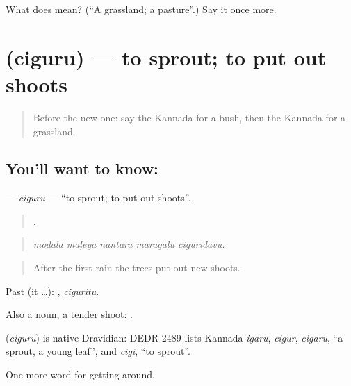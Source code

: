 \begin{tcolorbox}[breakable,colback=teal!4,colframe=teal!35!black,title={Before you move on}]
What does  mean? (\textquotedblleft{}A grassland; a pasture\textquotedblright{}.) Say it once more.
\end{tcolorbox}
\section[\texorpdfstring{\kn{ಚಿಗುರು} (ciguru)}{ಚಿಗುರು (ciguru)}]{ (ciguru) — to sprout; to put out shoots}

\label{lesson:KA-C479-ciguru}



\begin{quote}
Before the new one: say the Kannada for a bush, then the Kannada for a grassland.
\end{quote}

\subsection*{You'll want to know: }
\textbf{} — \emph{ciguru} — \textquotedblleft{}to sprout; to put out shoots\textquotedblright{}.

\begin{quote}
    .
\end{quote}

\begin{quote}
\emph{modala maḷeya nantara maragaḷu ciguridavu.}
\end{quote}

\begin{quote}
After the first rain the trees put out new shoots.
\end{quote}

Past (it …): , \emph{ciguritu}.

Also a noun, a tender shoot:  .

\begin{cousinweb}
\textbf{} (\emph{ciguru}) is native Dravidian: DEDR 2489 lists Kannada \emph{igaru}, \emph{cigur}, \emph{cigaru}, \textquotedblleft{}a sprout, a young leaf\textquotedblright{}, and \emph{cigi}, \textquotedblleft{}to sprout\textquotedblright{}.
\end{cousinweb}

\begin{grammarlens}[title={What you've built}]
One more word for getting around.
\end{grammarlens}


